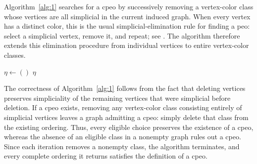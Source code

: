 \documentclass[12pt]{amsart}
\theoremstyle{plain}
\theoremstyle{definition}
\theoremstyle{remark}
\newcommand{\1}{\mathbf{1}}
\begin{document}
Algorithm~\ref{alg:1} searches for a cpeo by successively removing a vertex-color class whose vertices are all simplicial in the current induced graph. When every vertex has a distinct color, this is the usual simplicial-elimination rule for finding a peo: select a simplicial vertex, remove it, and repeat; see \citet[Section~4.2]{VA14}. The algorithm therefore extends this elimination procedure from individual vertices to entire vertex-color classes.
\begin{algorithm}
\caption{Greedy Algorithm for finding a cpeo \\
\texttt{greedy\_find\_cpeo(\(G, \mathcal{V}\))} }\label{alg:1}
\SetAlgoLined
{}

\(\eta \gets ()\)\;
\Return \(\eta\)\;
\end{algorithm}

The correctness of Algorithm~\ref{alg:1} follows from the fact that deleting vertices preserves simpliciality of the remaining vertices that were simplicial before deletion. If a cpeo exists, removing any vertex-color class consisting entirely of simplicial vertices leaves a graph admitting a cpeo: simply delete that class from the existing ordering. Thus, every eligible choice preserves the existence of a cpeo, whereas the absence of an eligible class in a nonempty graph rules out a cpeo. Since each iteration removes a nonempty class, the algorithm terminates, and every complete ordering it returns satisfies the definition of a cpeo.
\end{document}
